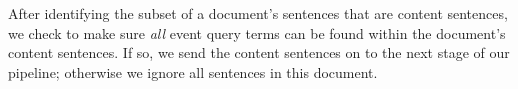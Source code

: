 After identifying the subset of a document's sentences that are content sentences, we check to make sure \emph{all} event query terms can be found within the document's content sentences. If so, we send the content sentences on to the next stage of our pipeline; otherwise we ignore all sentences in this document.

